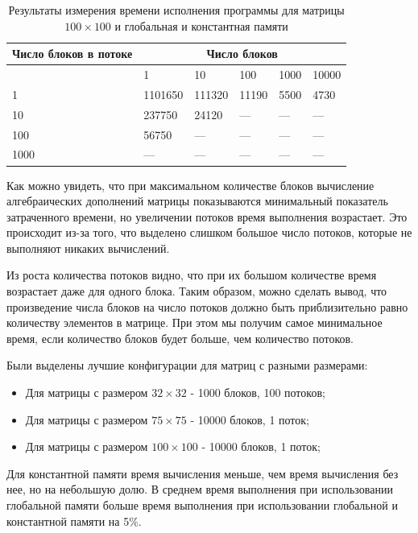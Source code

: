 \documentclass[a4paper, final]{article}
\begin{document}
\begin{table}[H]
    \centering
    \caption{Результаты измерения времени исполнения программы для матрицы $100 \times 100$ и глобальная и константная памяти}
    \footnotesize
    \begin{tabularx}{\textwidth}{|X|X|X|X|X|X|}
    \hline
    \textbf{Число блоков в потоке} & \multicolumn{5}{|c|}{\textbf{Число блоков}} \\ 
    \hline
    &  1&	10&	100&	1000&	10000 \\
    \hline
    1&	1101650&	111320&	11190&	5500&	4730\\
    \hline
    10&	237750&	24120&	---&	---&	---\\
    \hline
    100&	56750&	---&	---&	---&	---\\
    \hline
    1000&	---&	---&	---&	---&	---\\
    \hline
    \end{tabularx}
\end{table}


Как можно увидеть, что при максимальном количестве блоков вычисление алгебраических дополнений матрицы показываются минимальный показатель затраченного времени, но увеличении потоков время выполнения возрастает. Это происходит из-за того, что выделено слишком большое число потоков, которые не выполняют никаких вычислений. 

Из роста количества потоков видно, что при их большом количестве время возрастает даже для одного блока. Таким образом, можно сделать вывод, что произведение числа блоков на число потоков должно быть приблизительно равно количеству элементов в матрице. При этом мы получим самое минимальное время, если количество блоков будет больше, чем количество потоков.

Были выделены лучшие конфигурации для матриц с разными размерами:
\begin{itemize}
    \item Для матрицы с размером $32 \times 32$ - 1000 блоков, 100 потоков;
    \item Для матрицы с размером $75 \times 75$ - 10000 блоков, 1 поток;
    \item Для матрицы с размером $100 \times 100$ - 10000 блоков, 1 поток;
\end{itemize}

Для константной памяти время вычисления меньше, чем время вычисления без нее, но на небольшую долю. В среднем время выполнения при использовании глобальной памяти больше время выполнения при использовании глобальной и константной памяти на 5\%. 
\end{document}
